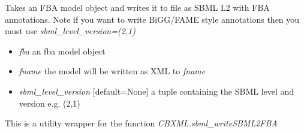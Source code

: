 \documentclass[a4paper,11pt,english]{sphinxmanual}
\begin{document}
\begin{fulllineitems}
\label{modules_doc:cbmpy.CBWrite.writeSBML2FBA}
Takes an FBA model object and writes it to file as SBML L2 with FBA annotations.
Note if you want to write BiGG/FAME style annotations then you must use \emph{sbml\_level\_version=(2,1)}
\begin{itemize}
\item {} 
\emph{fba} an fba model object

\item {} 
\emph{fname} the model will be written as XML to \emph{fname}

\item {} 
\emph{sbml\_level\_version} {[}default=None{]} a tuple containing the SBML level and version e.g. (2,1)

\end{itemize}

This is a utility wrapper for the function \emph{CBXML.sbml\_writeSBML2FBA}

\end{fulllineitems}

\end{document}
